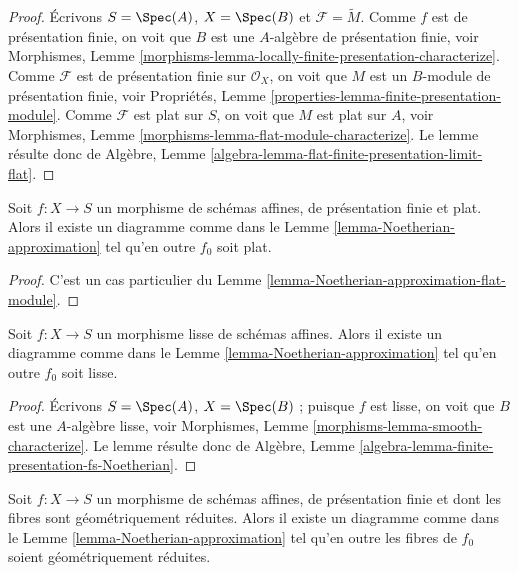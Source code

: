 \begin{proof}
Écrivons $S = \Spec(A)$, $X = \Spec(B)$ et
$\mathcal{F} = \widetilde{M}$. Comme $f$ est de présentation finie, on voit que
$B$ est une $A$-algèbre de présentation finie, voir
Morphismes,
Lemme \ref{morphisms-lemma-locally-finite-presentation-characterize}.
Comme $\mathcal{F}$ est de présentation finie sur $\mathcal{O}_X$, on voit que
$M$ est un $B$-module de présentation finie, voir
Propriétés, Lemme \ref{properties-lemma-finite-presentation-module}.
Comme $\mathcal{F}$ est plat sur $S$, on voit que $M$ est plat sur $A$, voir
Morphismes, Lemme \ref{morphisms-lemma-flat-module-characterize}.
Le lemme résulte donc de
Algèbre, Lemme \ref{algebra-lemma-flat-finite-presentation-limit-flat}.
\end{proof}

\begin{lemma}
\label{lemma-Noetherian-approximation-flat}
Soit $f : X \to S$ un morphisme de schémas affines, de
présentation finie et plat. Alors il existe un diagramme comme dans le
Lemme \ref{lemma-Noetherian-approximation}
tel qu'en outre $f_0$ soit plat.
\end{lemma}

\begin{proof}
C'est un cas particulier du
Lemme \ref{lemma-Noetherian-approximation-flat-module}.
\end{proof}

\begin{lemma}
\label{lemma-Noetherian-approximation-smooth}
Soit $f : X \to S$ un morphisme lisse de schémas affines.
Alors il existe un diagramme comme dans le
Lemme \ref{lemma-Noetherian-approximation}
tel qu'en outre $f_0$ soit lisse.
\end{lemma}

\begin{proof}
Écrivons $S = \Spec(A)$, $X = \Spec(B)$ ;
puisque $f$ est lisse, on voit que $B$ est une $A$-algèbre lisse, voir
Morphismes,
Lemme \ref{morphisms-lemma-smooth-characterize}.
Le lemme résulte donc de
Algèbre, Lemme \ref{algebra-lemma-finite-presentation-fs-Noetherian}.
\end{proof}

\begin{lemma}
\label{lemma-Noetherian-approximation-geometrically-reduced}
Soit $f : X \to S$ un morphisme de schémas affines, de
présentation finie et dont les fibres sont géométriquement réduites.
Alors il existe un diagramme comme dans le
Lemme \ref{lemma-Noetherian-approximation}
tel qu'en outre les fibres de $f_0$ soient géométriquement réduites.
\end{lemma}

